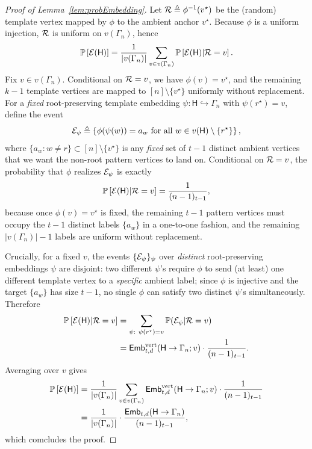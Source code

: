 \documentclass[12pt]{article}
\newcommand {\pr} {\mathbb{P}}
\newcommand{\calE}{{\cal E}}
\newcommand{\calR}{{\cal R}}
\newcommand{\pp}[1]{\left[#1\right]}
\newcommand{\ppp}[1]{\left\{#1\right\}}
\newcommand{\s}[1]{\mathsf{#1}}
\begin{document}
\begin{proof}[Proof of Lemma~\ref{lem:probEmbedding}]
Let $\calR\triangleq\phi^{-1}(v^\star)$ be the (random) template vertex mapped by $\phi$ to the ambient anchor $v^\star$. Because $\phi$ is a uniform injection, $\calR$ is uniform on $v(\Gamma_n)$, hence
\begin{align}
\pr\pp{\calE(\s{H})}=\frac{1}{|v(\Gamma_n)|}\sum_{v\in v(\Gamma_n)}\pr\pp{\calE(\s{H})\vert\calR=v}.
\end{align}
Fix $v\in v(\Gamma_n)$. Conditional on $\calR=v$, we have $\phi(v)=v^\star$, and the remaining $k-1$ template vertices are mapped to $[n]\setminus\{v^\star\}$ uniformly without replacement. For a \emph{fixed} root-preserving template embedding $\psi:\s{H}\hookrightarrow\Gamma_n$ with $\psi(r^\star)=v$, define the event
\begin{align}
\calE_\psi\triangleq\ppp{\phi(\psi(w))=a_w \ \text{for all } w\in v(\s{H})\setminus\{r^\star\}},
\end{align}
where $\{a_w:w\neq r\}\subset[n]\setminus\{v^\star\}$ is any \emph{fixed} set of $t-1$ distinct ambient vertices that we want the non-root pattern vertices to land on. Conditional on $\calR=v$, the probability that $\phi$ realizes $\calE_\psi$ is exactly
\begin{align}
\pr\pp{\calE(\s{H})\vert\calR=v}=\frac{1}{(n-1)_{t-1}},
\end{align}
because once $\phi(v)=v^\star$ is fixed, the remaining $t-1$ pattern vertices must occupy the $t-1$ distinct labels $\{a_w\}$ in a one-to-one fashion, and the remaining $|v(\Gamma_n)|-1$ labels are uniform without replacement.

Crucially, for a fixed $v$, the events $\{\calE_\psi\}_\psi$ over \emph{distinct} root-preserving embeddings $\psi$ are disjoint: two different $\psi$'s require $\phi$ to send (at least) one different template vertex to a \emph{specific} ambient label; since $\phi$ is injective and the target $\{a_w\}$ has size $t-1$, no single $\phi$ can satisfy two distinct $\psi$'s simultaneously. Therefore
\begin{align}
\pr\pp{\calE(\s{H})\vert\calR=v}
&=\sum_{\psi:\ \psi(r^\star)=v}\pr(\calE_\psi\vert\calR=v)\\
&=\s{Emb}^{\mathrm{vert}}_{t,d}(\s{H}\to\Gamma_n;v)\cdot \frac{1}{(n-1)_{t-1}}.
\end{align}
Averaging over $v$ gives
\begin{align}
\pr\pp{\calE(\s{H})}
&=\frac{1}{|v(\Gamma_n)|}\sum_{v\in v(\Gamma_n)}\s{Emb}^{\mathrm{vert}}_{t,d}(\s{H}\to\Gamma_n;v)\cdot \frac{1}{(n-1)_{t-1}}\\
&=\frac{1}{|v(\Gamma_n)|}\cdot \frac{\s{Emb}_{t,d}(\s{H}\to\Gamma_n)}{(n-1)_{t-1}},
\end{align}
which comcludes the proof.
\end{proof}
\end{document}
